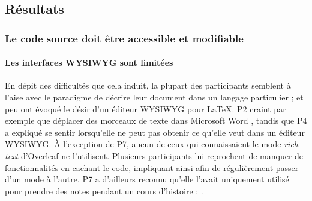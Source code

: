 \subsection{Résultats}
\setcounter{themenumber}{1}

\subsubsection{\printthemenumber{} Le code source doit être accessible et modifiable}

\paragraph{Les interfaces WYSIWYG sont limitées}
En dépit des difficultés que cela induit, la plupart des participants semblent à l'aise avec le paradigme de décrire leur document dans un langage particulier ; et peu ont évoqué le désir d'un éditeur WYSIWYG pour \LaTeX{}.
P2 craint par exemple que déplacer des morceaux de texte dans Microsoft Word , tandis que P4 a expliqué se sentir  lorsqu'elle ne peut pas obtenir ce qu'elle veut dans un éditeur WYSIWYG.
À l'exception de P7, aucun de ceux qui connaissaient le mode \emph{rich text} d'Overleaf ne l'utilisent.
Plusieurs participants lui reprochent de manquer de fonctionnalités en cachant le code, impliquant ainsi  afin de régulièrement passer d'un mode à l'autre.
P7 a d'ailleurs reconnu qu'elle l'avait uniquement utilisé pour prendre des notes pendant un cours d'histoire : .

